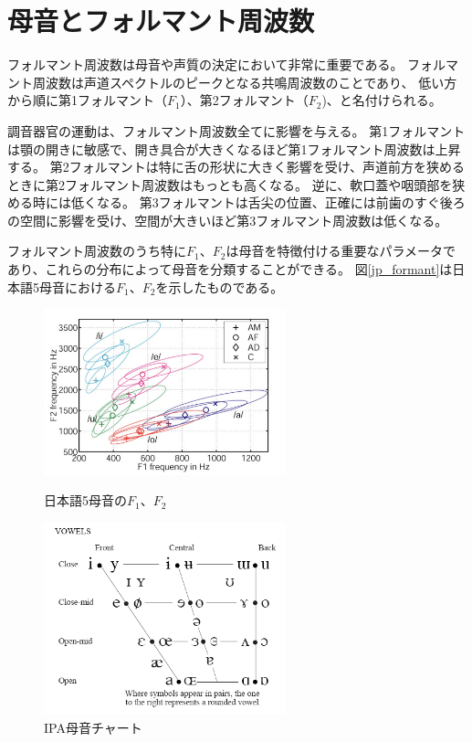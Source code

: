 \documentclass[10.5ptj,a4j,dvipdfmx,uplatex, oneside, openany, report]{jsbook}%
\begin{document}
\section{母音とフォルマント周波数}
フォルマント周波数は母音や声質の決定において非常に重要である。
フォルマント周波数は声道スペクトルのピークとなる共鳴周波数のことであり、
低い方から順に第1フォルマント（$F_1$）、第2フォルマント（$F_2$)、と名付けられる。

調音器官の運動は、フォルマント周波数全てに影響を与える。
第1フォルマントは顎の開きに敏感で、開き具合が大きくなるほど第1フォルマント周波数は上昇する。
第2フォルマントは特に舌の形状に大きく影響を受け、声道前方を狭めるときに第2フォルマント周波数はもっとも高くなる。
逆に、軟口蓋や咽頭部を狭める時には低くなる。
第3フォルマントは舌尖の位置、正確には前歯のすぐ後ろの空間に影響を受け、空間が大きいほど第3フォルマント周波数は低くなる。

フォルマント周波数のうち特に$F_1$、$F_2$は母音を特徴付ける重要なパラメータであり、これらの分布によって母音を分類することができる\cite{japanese_vowels}。
図\ref{jp_formant}は日本語5母音における$F_1$、$F_2$を示したものである。

\begin{figure}[htbp]
    \begin{minipage}{0.5\hsize}
        \begin{center}
            \includegraphics[clip,width=7.0cm]{5母音.png}
            \caption{日本語5母音の$F_1$、$F_2$\cite{japanese_vowels}}
            \label{jp_formant}
        \end{center}
    \end{minipage}
    \begin{minipage}{0.5\hsize}
        \begin{center}
            \includegraphics[clip,width=7.0cm]{vowels.png}
            \caption{IPA母音チャート}
            \label{vowels}
        \end{center}
    \end{minipage}
\end{figure}
\end{document}
